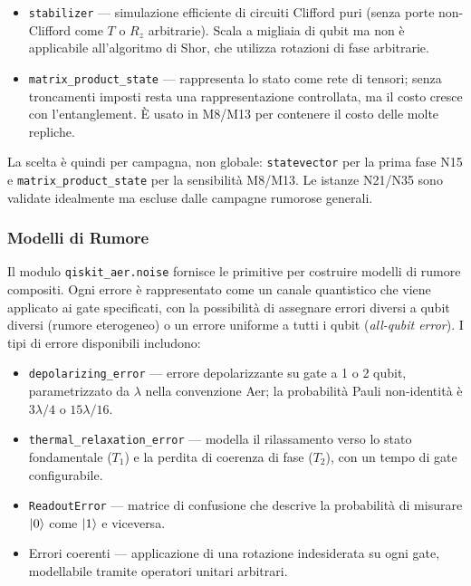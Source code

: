 \begin{onehalfspace}
\begin{itemize}
    \item \texttt{stabilizer} — simulazione efficiente di circuiti Clifford puri (senza porte non-Clifford come $T$ o $R_z$ arbitrarie). Scala a migliaia di qubit ma non è applicabile all'algoritmo di Shor, che utilizza rotazioni di fase arbitrarie.

    \item \texttt{matrix\_product\_state} — rappresenta lo stato come rete di tensori; senza troncamenti imposti resta una rappresentazione controllata, ma il costo cresce con l'entanglement. È usato in M8/M13 per contenere il costo delle molte repliche.
\end{itemize}

La scelta è quindi per campagna, non globale: \texttt{statevector} per la prima fase N15 e \texttt{matrix\_product\_state} per la sensibilità M8/M13. Le istanze N21/N35 sono validate idealmente ma escluse dalle campagne rumorose generali.

\subsubsection{Modelli di Rumore}

Il modulo \texttt{qiskit\_aer.noise} fornisce le primitive per costruire modelli di rumore compositi. Ogni errore è rappresentato come un canale quantistico che viene applicato ai gate specificati, con la possibilità di assegnare errori diversi a qubit diversi (rumore eterogeneo) o un errore uniforme a tutti i qubit (\textit{all-qubit error}). I tipi di errore disponibili includono:

\begin{itemize}
    \item \texttt{depolarizing\_error} — errore depolarizzante su gate a 1 o 2 qubit, parametrizzato da $\lambda$ nella convenzione Aer; la probabilità Pauli non-identità è $3\lambda/4$ o $15\lambda/16$.
    \item \texttt{thermal\_relaxation\_error} — modella il rilassamento verso lo stato fondamentale ($T_1$) e la perdita di coerenza di fase ($T_2$), con un tempo di gate configurabile.
    \item \texttt{ReadoutError} — matrice di confusione che descrive la probabilità di misurare $\ket{0}$ come $\ket{1}$ e viceversa.
    \item Errori coerenti — applicazione di una rotazione indesiderata su ogni gate, modellabile tramite operatori unitari arbitrari.
\end{itemize}


\end{onehalfspace}
